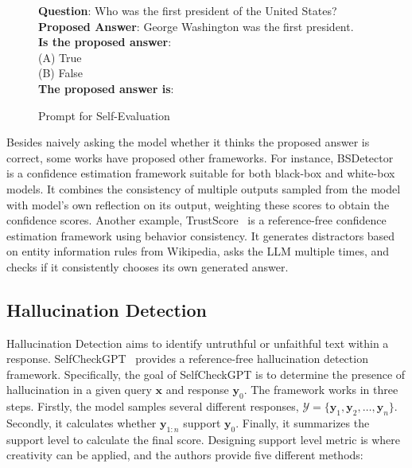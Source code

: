 \documentclass[lettersize,journal]{IEEEtran}
\begin{document}
\begin{figure}[h!]
\centering

\begin{tcolorbox}[colback=blue!5!white,colframe=blue!75!black,title=Prompt for Self-Evaluation,fontupper=\footnotesize,fonttitle=\scriptsize]
\textbf{Question}: Who was the first president of the United States? \\
\textbf{Proposed Answer}: George Washington was the first president. \\
\textbf{Is the proposed answer}: \\
(A) True \\
(B) False \\
\textbf{The proposed answer is}:
\end{tcolorbox}

\caption{Prompt for Self-Evaluation~\cite{TheoryKnowKnow_22_arXiv_Anthropic}}
\label{fig:prompt_for_self_eval}
\end{figure}

Besides naively asking the model whether it thinks the proposed answer is correct, some works have proposed other frameworks. For instance, BSDetector~\cite{TheoryUncertainty_23_arXiv_UoMaryland} is a confidence estimation framework suitable for both black-box and white-box models. It combines the consistency of multiple outputs sampled from the model with model's own reflection on its output, weighting these scores to obtain the confidence scores. Another example, TrustScore~\cite{TrustScore_24_arXiv_UoEdinburgh} is a reference-free confidence estimation framework using behavior consistency. It generates distractors based on entity information rules from Wikipedia, asks the LLM multiple times, and checks if it consistently chooses its own generated answer.


\subsection{Hallucination Detection} \label{sec:hallucination}


\noindent Hallucination Detection aims to identify untruthful or unfaithful text within a response.  SelfCheckGPT~\cite{HalluSelfCheckGPT_23_EMNLP_Cambridge} provides a reference-free hallucination detection framework. Specifically, the goal of SelfCheckGPT is to determine the presence of hallucination in a given query $\boldsymbol{x}$ and response $\boldsymbol{y}_0$. The framework works in three steps. Firstly, the model samples several different responses, $\mathcal{Y}= \{\boldsymbol{y}_1, \boldsymbol{y}_2, \ldots, \boldsymbol{y}_n \}$. Secondly, it calculates whether $\boldsymbol{y}_{1:n}$ support $\boldsymbol{y}_0$. Finally, it summarizes the support level to calculate the final score. Designing support level metric is where creativity can be applied, and the authors provide five different methods:
\end{document}
